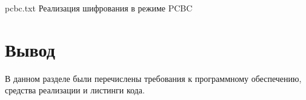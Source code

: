 {pcbc.txt} %
{Реализация шифрования в режиме PCBC} %
%
%
%
%
%
%
%
%
%
%
%
%

\section*{Вывод}

В данном разделе были перечислены требования к программному обеспечению, средства реализации и листинги кода.

    